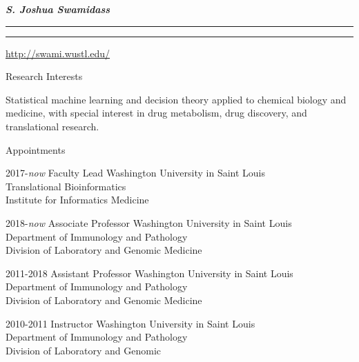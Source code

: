 \documentclass[10pt]{article}
\begin{document}
\settowidth{\cvlabelwidth}{%
\cvlabelfont 2009-2009%
}%
\begin{cv}{\huge \it \bfseries S. Joshua Swamidass}
\vskip3pt
\hrule\hrule
\vskip3pt
\hfill \url{http://swami.wustl.edu/}

{
\setlength{\cvlabelsep}{0mm}
\setlength{\cvlabelwidth}{0mm}
\begin{cvlist}{Research Interests}
\item Statistical machine learning and decision theory applied to chemical biology and medicine, with special interest in drug metabolism, drug discovery, and translational research.
\end{cvlist}
}

\begin{cvlist}{Appointments}
\item[2017-\emph{now}] Faculty Lead \hfill Washington University in Saint Louis\\  \hspace*{\fill} Translational Bioinformatics\\  \hspace*{\fill} Institute for Informatics
Medicine
\item[2018-\emph{now}] Associate Professor \hfill Washington University in Saint Louis\\  \hspace*{\fill} Department of Immunology and Pathology\\  \hspace*{\fill} Division of Laboratory and Genomic Medicine
\item[2011-2018] Assistant Professor \hfill Washington University in Saint Louis\\  \hspace*{\fill} Department of Immunology and Pathology\\  \hspace*{\fill} Division of Laboratory and Genomic 
Medicine
\item[2010-2011] Instructor \hfill Washington University in Saint Louis\\  \hspace*{\fill} Department of Immunology and Pathology\\  \hspace*{\fill} Division of Laboratory and Genomic 

\end{cvlist}
\end{cv}
\end{document}
